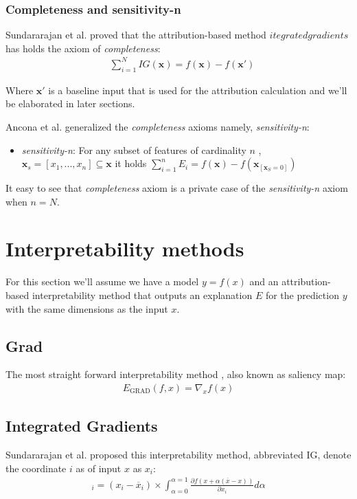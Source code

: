 \documentclass[12pt]{report}
\begin{document}
\subsubsection{Completeness and sensitivity-n}
Sundararajan et al. \cite{DBLP:journals/corr/SundararajanTY17} proved that the attribution-based method $itegrated gradients$ has holds the axiom of \textit{completeness}:
 \begin{align*}
	&\sum_{i=1}^N IG(\mathbf{x}) = f(\mathbf{x})-f(\mathbf{x}')
\end{align*}

Where $\mathbf{x}'$ is a baseline input that is used for the attribution calculation and we'll be elaborated in later sections.  
 
Ancona et al. \cite{https://doi.org/10.48550/arxiv.1711.06104} generalized the \textit{completeness} axioms namely, \textit{sensitivity-n}:
\begin{itemize}
	\item \textit{sensitivity-n}: For any subset of features of cardinality $n$ , $\mathbf{x}_s= [x_1, ...,x_n] \subseteq \mathbf{x} $ it holds $\sum_{i=1}^n E_i = f(\mathbf{x})- f(\mathbf{x}_{[\mathbf{x}_S =0]})$ 
\end{itemize}

It easy to see that \textit{completeness} axiom is a private case of the \textit{sensitivity-n} axiom when $n=N$.

\newpage
\section{Interpretability methods}

For this section we'll assume we have a model $y=f(x)$ and an attribution-based interpretability  method that outputs an explanation $E$ for the prediction $y$ with the same dimensions as the input $x$.

\subsection{Grad}
	The most straight forward interpretability method \cite{baehrens2010explain} \cite{https://doi.org/10.48550/arxiv.1312.6034}, also known as saliency map:
\begin{align*}
	E_\text{GRAD}(f, x)  = \nabla_{x}f(x)
\end{align*}

\subsection{Integrated Gradients}
Sundararajan et al. \cite{DBLP:journals/corr/SundararajanTY17} proposed this interpretability method, abbreviated IG, denote the coordinate $i$ as of input $x$ as $x_i$: 
\begin{align*}
	[E_\text{IG}(f, x)]_i  = (x_i - \overline{x}_i) \times \int_{\alpha=0}^{\alpha=1}\frac{\partial f(x+ \alpha(\overline{x}-x ))}{\partial x_i} d \alpha
\end{align*}
\end{document}

